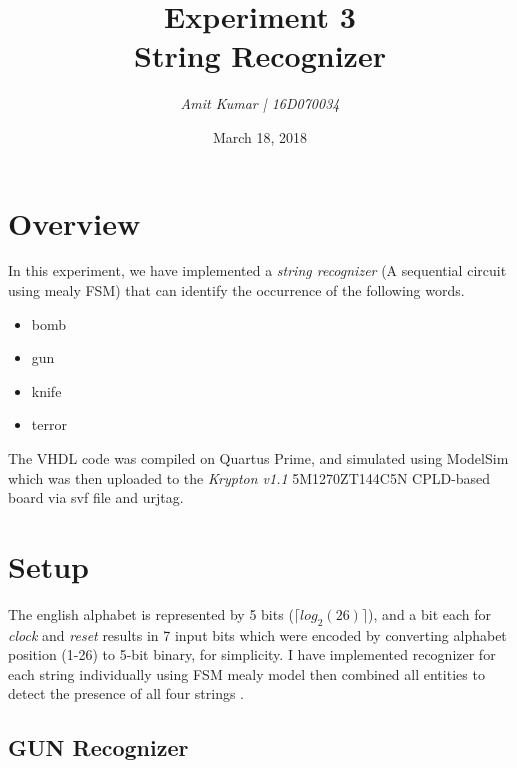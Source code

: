 \documentclass[a4paper, 11pt]{article}
\title{\bf Experiment 3\\\vspace*{2mm} String Recognizer}
\author{\it Amit Kumar | 16D070034}
\date{March 18, 2018}
\begin{document}
\maketitle
\section*{Overview}
In this experiment, we have implemented a \emph{string recognizer} (A sequential circuit using mealy FSM) that can identify the occurrence of the following words.
\begin{itemize}

	\item bomb
	\item gun
	\item knife
	\item terror
	
\end{itemize}

The VHDL code was compiled on Quartus Prime, and simulated using ModelSim which
 was then uploaded to the {\em Krypton v1.1} 5M1270ZT144C5N CPLD-based board via svf file and urjtag.


\section{Setup}
The english alphabet is represented by 5 bits ($\lceil log_2(26) \rceil$), and a bit each for \emph{clock} and \emph{reset} results in 7 input bits which were encoded by converting alphabet position (1-26) to 5-bit binary, for simplicity. I have implemented recognizer for each string individually using FSM mealy model then combined all entities to detect the presence of all four strings .

\subsection{GUN Recognizer}
\end{document}
